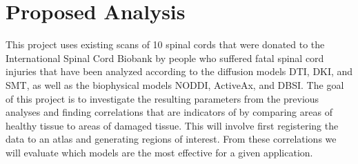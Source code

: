 \section{Proposed Analysis}
This project uses existing \dmri scans of 10 spinal cords that were donated to the International Spinal Cord Biobank by people who suffered fatal spinal cord injuries that have been analyzed according to the diffusion models DTI, DKI, and SMT, as well as the biophysical models NODDI, ActiveAx, and DBSI. The goal of this project is to investigate the resulting parameters from the previous analyses and finding correlations that are indicators of \sci by comparing areas of healthy tissue to areas of damaged tissue. This will involve first registering the \dmri data to an atlas and generating regions of interest. From these correlations we will evaluate which models are the most effective for a given application.